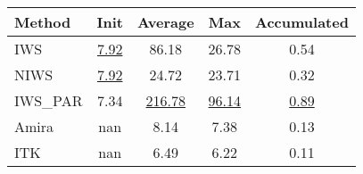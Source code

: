 \begin{table}
\centering
\label{tab:3d_exp}
\begin{tabular}{|l|c|c|c|c|}
\hline
Method & Init & Average & Max & Accumulated \\
\hline
IWS & \underline{7.92} & 86.18 & 26.78 & 0.54 \\
NIWS & \underline{7.92} & 24.72 & 23.71 & 0.32 \\
IWS_PAR & 7.34 & \underline{216.78} & \underline{96.14} & \underline{0.89} \\
Amira & nan & 8.14 & 7.38 & 0.13 \\
ITK & nan & 6.49 & 6.22 & 0.11 \\
\hline
\end{tabular}
\end{table}
